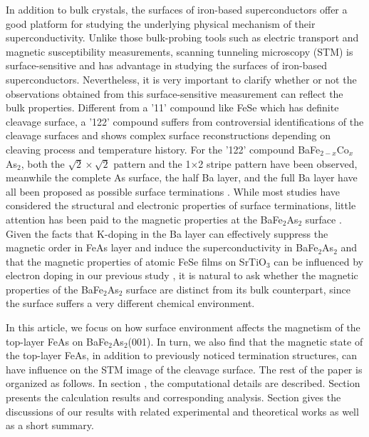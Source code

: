 \documentclass[twocolumn,aps,showpacs,prb]{revtex4-1}
\begin{document}
In addition to bulk crystals, the surfaces of iron-based superconductors offer a good platform for studying the underlying physical mechanism of their superconductivity. Unlike those bulk-probing tools such as electric transport and magnetic susceptibility measurements, scanning tunneling microscopy (STM) is surface-sensitive and has advantage in studying the surfaces of iron-based superconductors.  Nevertheless, it is very important to clarify whether or not the observations obtained from this surface-sensitive measurement can reflect the bulk properties. Different from a '11' compound like FeSe which has definite cleavage surface\cite{13MasseeF(2009)PRB}, a '122' compound suffers from controversial identifications of the cleavage surfaces and shows complex surface reconstructions depending on cleaving process and temperature history\cite{15NascimentoVB(2009)PRL,Li2012PRB,18NiestemskiFC(2009)arXiv:0906.2761,19ChuangTM(2010)Science,20BoyerMC(2008)arXiv:0806.4400,21YinY(2009)PRL,22MasseeF2(2009)PRB, 23MasseeF(2010)EPL,24PanSHBAPSD,25HuiZhang(2010)PRB,26VanHeumenE(2011)PRL}. For the '122' compound BaFe$_{2-x}$Co$_{x}$As$_{2}$, both the $\sqrt{2}\times\sqrt{2}$ pattern \cite{13MasseeF(2009)PRB} and the 1$\times$2 stripe pattern\cite{21YinY(2009)PRL} have been observed, meanwhile the complete As surface, the half Ba layer, and the full Ba layer have all been proposed as possible surface terminations \cite{30MGao(2010)PRB,31GProfeta(2010)PRB}. While most studies have considered the structural and electronic properties of surface terminations, little attention has been paid to the magnetic properties at the BaFe$_{2}$As$_{2}$ surface \cite{Li2012PRB}. Given the facts that K-doping in the Ba layer can effectively suppress the magnetic order in FeAs layer and induce the superconductivity in BaFe$_{2}$As$_{2}$ \cite{5HChen(2009)EPL,33HHWen(2011)RCMP} and that the magnetic properties of atomic FeSe films on SrTiO$_{3}$ can be influenced by electron doping in our previous study \cite{34Kai(2015)PRB}, it is natural to ask whether the magnetic properties of the BaFe$_{2}$As$_{2}$ surface are distinct from its bulk counterpart, since the surface suffers a very different chemical environment.

In this article, we focus on how surface environment affects the magnetism of the top-layer FeAs on BaFe$_{2}$As$_{2}$(001). In turn, we also find that the magnetic state of the top-layer FeAs, in addition to previously noticed termination structures, can have influence on the STM image of the cleavage surface. The rest of the paper is organized as follows. In section \uppercase\expandafter{} , the computational details are described. Section \uppercase\expandafter{} presents the calculation results and corresponding analysis. Section \uppercase\expandafter{} gives the discussions of our results with related experimental and theoretical works as well as a short summary.
\end{document}
